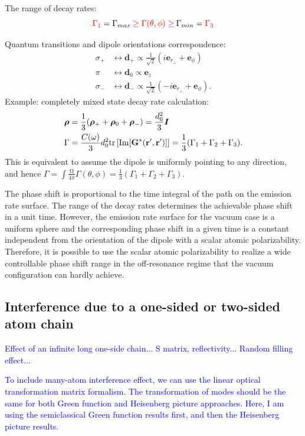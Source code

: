 \documentclass[preprint,aps,pra,onecolumn]{revtex4-1} %
\begin{document}
The range of decay rates:
$$\mathbin{\color{red}{\Gamma_1}}=\Gamma_{max}\mathbin{\color{red}{\ge \Gamma (\theta,\phi) \ge}} \Gamma_{min}=\mathbin{\color{red}{\Gamma_3}}$$

Quantum transitions and dipole orientations correspondence:
\begin{align}
\sigma_+ &\leftrightarrow \mathbf{d}_+\propto \frac{1}{\sqrt{2}}(i\mathbf{e}_{r\!_\perp}+\mathbf{e}_\phi)\\
\pi &\leftrightarrow \mathbf{d}_0 \propto \mathbf{e}_z\\
\sigma_- &\leftrightarrow \mathbf{d}_-\propto \frac{1}{\sqrt{2}}(-i\mathbf{e}_{r\!_\perp}+\mathbf{e}_\phi).
\end{align}
Example: completely mixed state decay rate calculation:
\begin{align}
\boldsymbol{\rho} &=\frac{1}{3}(\boldsymbol{\rho}_++\boldsymbol{\rho}_0+\boldsymbol{\rho}_-)=\frac{d_0^2}{3}\boldsymbol{I}\\
\Gamma &=\frac{C(\omega)}{3}d_0^2 \mathrm{tr}\left[ \mathrm{Im}[\mathbf{G}^*(\mathbf{r}',\mathbf{r}')] \right]=\frac{1}{3}(\Gamma_1+\Gamma_2+\Gamma_3).
\end{align}
This is equivalent to assume the dipole is uniformly pointing to any direction, and hence
$\Gamma = \int \frac{\mathrm{\Omega}}{4\pi}\Gamma(\theta,\phi)=\frac{1}{3}(\Gamma_1+\Gamma_2+\Gamma_3)$.


The phase shift is proportional to the time integral of the path on the emission rate surface. The range of the decay rates determines the achievable phase shift in a unit time. However, the emission rate surface for the vacuum case is a uniform sphere and the corresponding phase shift in a given time is a constant independent from the orientation of the dipole with a scalar atomic polarizability. Therefore, it is possible to use the scalar atomic polarizability to realize a wide controllable phase shift range in the off-resonance regime that the vacuum configuration can hardly achieve. 


\subsection{Interference due to a one-sided or two-sided atom chain}\label{sec:atomchain}
\textcolor{blue}{Effect of an infinite long one-side chain... S matrix, reflectivity... Random filling effect...}

\textcolor{blue}{To include many-atom interference effect, we can use the linear optical transformation matrix formalism. The transformation of modes should be the same for both Green function and Heisenberg picture approaches. Here, I am using the semiclassical Green function results first, and then the Heisenberg picture results. } 
\end{document}
